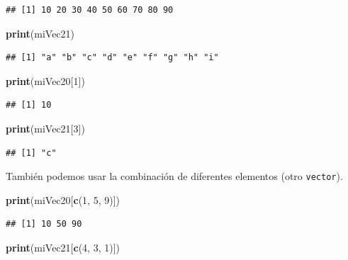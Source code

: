 \documentclass[]{book}
\newenvironment{Shaded}{\begin{snugshade}}{\end{snugshade}}
\newcommand{\KeywordTok}[1]{\textcolor[rgb]{0.13,0.29,0.53}{\textbf{#1}}}
\newcommand{\DecValTok}[1]{\textcolor[rgb]{0.00,0.00,0.81}{#1}}
\newcommand{\NormalTok}[1]{#1}
\begin{document}
\begin{verbatim}
## [1] 10 20 30 40 50 60 70 80 90
\end{verbatim}

\begin{Shaded}
\begin{Highlighting}[]
\KeywordTok{print}\NormalTok{(miVec21)}
\end{Highlighting}
\end{Shaded}

\begin{verbatim}
## [1] "a" "b" "c" "d" "e" "f" "g" "h" "i"
\end{verbatim}

\begin{Shaded}
\begin{Highlighting}[]
\KeywordTok{print}\NormalTok{(miVec20[}\DecValTok{1}\NormalTok{])}
\end{Highlighting}
\end{Shaded}

\begin{verbatim}
## [1] 10
\end{verbatim}

\begin{Shaded}
\begin{Highlighting}[]
\KeywordTok{print}\NormalTok{(miVec21[}\DecValTok{3}\NormalTok{])}
\end{Highlighting}
\end{Shaded}

\begin{verbatim}
## [1] "c"
\end{verbatim}

También podemos usar la combinación de diferentes elementos (otro
\texttt{vector}).

\begin{Shaded}
\begin{Highlighting}[]
\KeywordTok{print}\NormalTok{(miVec20[}\KeywordTok{c}\NormalTok{(}\DecValTok{1}\NormalTok{, }\DecValTok{5}\NormalTok{, }\DecValTok{9}\NormalTok{)])}
\end{Highlighting}
\end{Shaded}

\begin{verbatim}
## [1] 10 50 90
\end{verbatim}

\begin{Shaded}
\begin{Highlighting}[]
\KeywordTok{print}\NormalTok{(miVec21[}\KeywordTok{c}\NormalTok{(}\DecValTok{4}\NormalTok{, }\DecValTok{3}\NormalTok{, }\DecValTok{1}\NormalTok{)])}
\end{Highlighting}
\end{Shaded}
\end{document}
